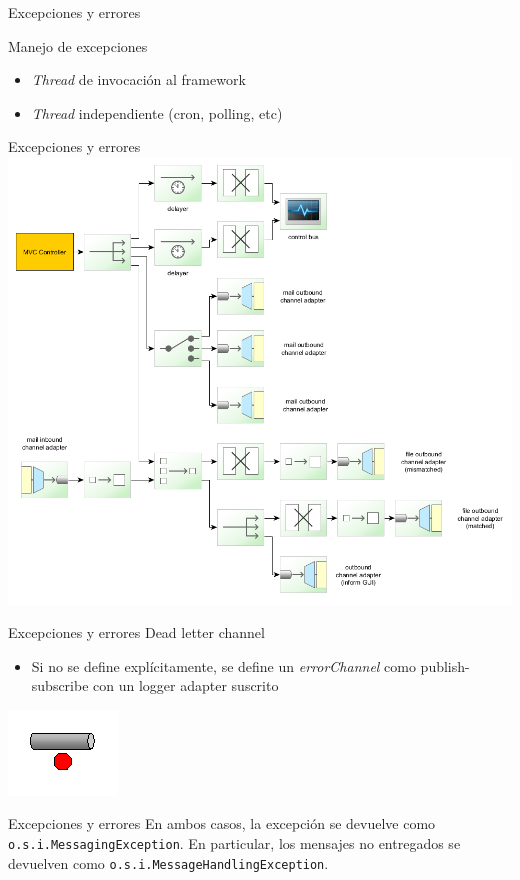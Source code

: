 \documentclass{beamer}
\begin{document}
\begin{frame}{Excepciones y errores}
\begin{center}
Manejo de excepciones
\end{center}
\begin{itemize}
\item \textit{Thread} de invocación al framework
\item \textit{Thread} independiente (cron, polling, etc)
\end{itemize}
\end{frame}

\begin{frame}{Excepciones y errores}
\includegraphics[width=0.7\linewidth]{sp-int-99}
\end{frame}

\begin{frame}{Excepciones y errores}
Dead letter channel
\begin{itemize}
\item Si no se define explícitamente, se define un \textit{errorChannel} como publish-subscribe con un logger adapter suscrito
\end{itemize}
\begin{center}
\includegraphics[width=0.2\linewidth]{sp-int-21}
\end{center}
\end{frame}

\begin{frame}[fragile]{Excepciones y errores}
En ambos casos, la excepción se devuelve como \verb|o.s.i.MessagingException|. En particular, los mensajes no entregados se devuelven como \verb|o.s.i.MessageHandlingException|.
\end{frame}
\end{document}
